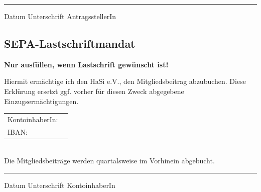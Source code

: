 \documentclass[a4paper]{article}
\begin{document}
    \vspace{1.5cm}
    \noindent\rule{\textwidth}{1pt}
    Datum \hspace{1.5cm} Unterschrift AntragsstellerIn

    \subsection*{SEPA-Lastschriftmandat}
    \textbf{Nur ausfüllen, wenn Lastschrift gewünscht ist!}

    Hiermit ermächtige ich den HaSi e.V., den Mitgliedsbeitrag abzubuchen.
    Diese Erklürung ersetzt ggf. vorher für diesen Zweck abgegebene Einzugsermächtigungen.\\

    \begin{Form}[]
      \begin{tabularx}{\textwidth}{p{3.2cm}  p{8.3cm}}
          KontoinhaberIn: & \hrulefill \\
          IBAN: & \hrulefill
      \end{tabularx}
    \end{Form}
    \\
    Die Mitgliedsbeiträge werden quartalsweise im Vorhinein abgebucht.

    \vspace{1.5cm}

    \noindent\rule{\textwidth}{1pt}
    Datum \hspace{1.5cm} Unterschrift KontoinhaberIn
\end{document}
